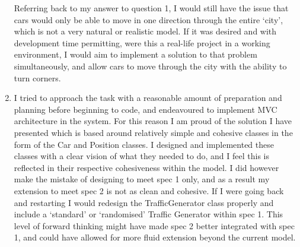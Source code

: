 \documentclass[11pt, oneside]{article}
\begin{document}
\begin{enumerate}
{ Referring back to my answer to question 1, I would still have the issue that cars would only be able to move in one direction through the entire `city', which is not a very natural or realistic model. If it was desired and with development time permitting, were this a real-life project in a working environment, I would aim to implement a solution to that problem simultaneously, and allow cars to move through the city with the ability to turn corners.}
\item{I tried to approach the task with a reasonable amount of preparation and planning before beginning to code, and endeavoured to implement MVC architecture in the system. For this reason I am proud of the solution I have presented which is based around relatively simple and cohesive classes in the form of the Car and Position classes. I designed and implemented these classes with a clear vision of what they needed to do, and I feel this is reflected in their respective cohesiveness within the model. I did however make the mistake of designing to meet spec 1 only, and as a result my extension to meet spec 2 is not as clean and cohesive. If I were going back and restarting I would redesign the TrafficGenerator class properly and include a `standard' or `randomised' Traffic Generator within spec 1. This level of forward thinking might have made spec 2 better integrated with spec 1, and could have allowed for more fluid extension beyond the current model.}
\end{enumerate}
\end{document}
